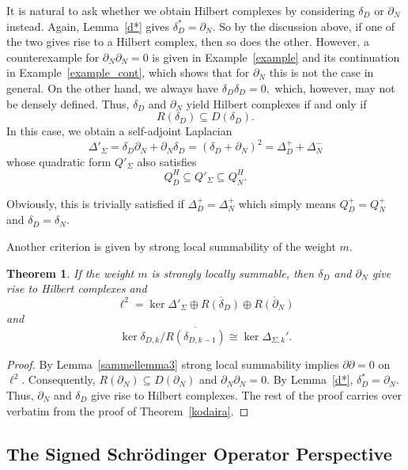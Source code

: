 \documentclass[10pt]{amsart}
\newtheorem{theorem}{Theorem}[section]
\theoremstyle{definition}
\begin{document}
It is natural to ask whether we obtain Hilbert complexes by considering $\delta_D$ or $\partial_N$ instead. 
Again, Lemma~\ref{d*} gives $\delta_{D}^{*}=\partial_{N}$. So by the discussion above,  if one of the two gives rise to a Hilbert complex, then so does the other.
However, a counterexample for $\partial_{N}\partial_{N}=0$
is given in Example~\ref{example} and its continuation in Example~\ref{example_cont}, which shows that for $\partial_N$ this is not the case in general. On the other hand, we always have $\delta_{D}\delta_{D}=0,$ which, however, may not be densely defined. Thus,  $\delta_{D}$ and $\partial_{N}$ yield Hilbert complexes if and only if
\begin{equation*}
	R(\delta_{D})\subseteq D(\delta_{D}).
\end{equation*}
In this case, we obtain a self-adjoint Laplacian 
$$\Delta'_{\Sigma} = \delta_D\partial_N+\partial_N\delta_D = (\delta_D+\partial_N)^2 = \Delta^+_{D}+\Delta^-_N$$
whose quadratic form $Q'_{\Sigma}$ also satisfies $$Q_{D}^{H}\subseteq Q'_{\Sigma}\subseteq Q^{H}_{N}.$$


Obviously, this is trivially satisfied if $\Delta_{D}^{+}=\Delta_{N}^{+}$ which simply means $Q^+ _{D}= Q^+_N$ and  $\delta_D = \delta_N.$ 

Another criterion is given by strong local summability of the weight $m$.
\begin{theorem}\label{kodaira2}
	If the weight $m$ is strongly locally summable, then $\delta_{D}$ and $\partial_{N}$ give rise to Hilbert complexes and 
		$$\ell^2 = \ker\Delta'_{\Sigma}\oplus\overline{R(\delta_D)}\oplus\overline{R(\partial_N)}$$
	and
	$$\ker\delta_{D,k}\slash \overline{R(\delta_{D,k-1})}\cong \ker\Delta_{\Sigma,k}'.$$
\end{theorem}
\begin{proof}
	By Lemma~\ref{sammellemma3}  strong local summability implies  $\partial\partial =0$ on $\ell^{2}$. 
	Consequently, $R(\partial_N)\subseteq D(\partial_N)$ and $\partial_N\partial_N = 0$. By Lemma~\ref{d*}, $\delta_{D}^{*}=\partial_{N}$. Thus, $\partial_{N}$ and $\delta_{D}$ give rise to Hilbert complexes. The rest of the proof carries over verbatim from the proof of Theorem~\ref{kodaira}.
\end{proof}









\subsection{The Signed Schrödinger Operator Perspective}\label{DiscSch}
\end{document}
